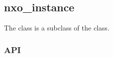 %
%
%
%
%

\subsection{nxo\_instance}
\label{nxo_instance}

The  class is a subclass of the 
class.

\subsubsection{API}
